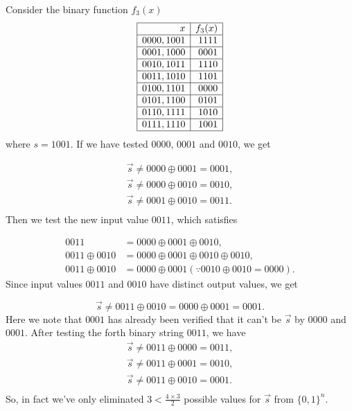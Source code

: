 \begin{example}
Consider the binary function $f_3(x)$
$$
\begin{array}{|r|r|}
	\hline x & f_3(x) \\
	\hline 0000,1001 & 1111 \\
	\hline 0001,1000 & 0001 \\
	\hline 0010,1011 & 1110 \\
	\hline 0011,1010 & 1101 \\
	\hline 0100,1101 & 0000 \\
	\hline 0101,1100 & 0101 \\
	\hline 0110,1111 & 1010 \\
	\hline 0111,1110 & 1001 \\
	\hline
\end{array}
$$
where $s=1001$. If we have tested $0000$, $0001$ and $0010$, we get

$$
\begin{aligned}
	\vec{s} \neq 0000 \oplus 0001 = 0001, \\
	\vec{s} \neq 0000 \oplus 0010 = 0010, \\
	\vec{s} \neq 0001 \oplus 0010 = 0011. \\
\end{aligned}
$$
Then we test the new input value $0011$, which satisfies

$$
\begin{aligned}
0011 &= 0000 \oplus 0001 \oplus 0010,\\
0011 \oplus 0010 &= 0000 \oplus 0001 \oplus0010 \oplus0010 ,\\
0011 \oplus 0010 &= 0000 \oplus 0001 (\because 0010 \oplus 0010 = 0000).
\end{aligned}
$$
Since input values $0011$ and $0010$ have distinct output values, we get 

$$
\vec{s} \neq 0011 \oplus 0010 = 0000 \oplus 0001 = 0001.
$$
Here we note that $0001$ has already been verified that it can't be $\vec{s}$ by $0000$ and $0001$. After testing the forth binary string $0011$, we have
$$
\begin{aligned}
	\vec{s} \neq 0011 \oplus 0000 = 0011, \\
	\vec{s} \neq 0011 \oplus 0001 = 0010, \\
	\vec{s} \neq 0011 \oplus 0010 = 0001. \\
\end{aligned}
$$
So, in fact we've only eliminated $3 < \frac{4 \times 3}{2}$ possible values for $\vec{s}$ from $\{0,1\}^n$.
\end{example}